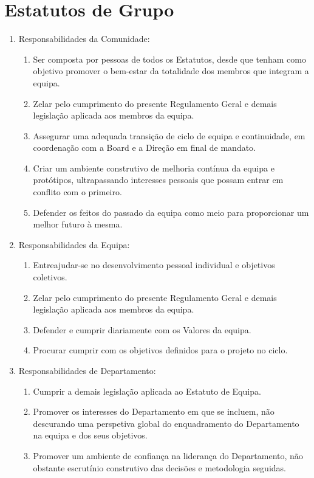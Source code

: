 \section{Estatutos de Grupo}
\begin{enumerate}
  \item Responsabilidades da Comunidade:
  \begin{enumerate}
    \item Ser composta por pessoas de todos os Estatutos, desde que tenham como objetivo promover o bem-estar da totalidade dos membros que integram a equipa.
    \item Zelar pelo cumprimento do presente Regulamento Geral e demais legislação aplicada aos membros da equipa.
    \item Assegurar uma adequada transição de ciclo de equipa e continuidade, em coordenação com a Board e a Direção em final de mandato.
    \item Criar um ambiente construtivo de melhoria contínua da equipa e protótipos, ultrapassando interesses pessoais que possam entrar em conflito com o primeiro.
    \item Defender os feitos do passado da equipa como meio para proporcionar um melhor futuro à mesma.
  \end{enumerate}
  \item Responsabilidades da Equipa:
  \begin{enumerate}
    \item Entreajudar-se no desenvolvimento pessoal individual e objetivos coletivos.
    \item Zelar pelo cumprimento do presente Regulamento Geral e demais legislação aplicada aos membros da equipa.
    \item Defender e cumprir diariamente com os Valores da equipa.
    \item Procurar cumprir com os objetivos definidos para o projeto no ciclo.
  \end{enumerate}
  \item Responsabilidades de Departamento:
  \begin{enumerate}
    \item Cumprir a demais legislação aplicada ao Estatuto de Equipa.
    \item Promover os interesses do Departamento em que se incluem, não descurando uma perspetiva global do enquadramento do Departamento na equipa e dos seus objetivos.
    \item Promover um ambiente de confiança na liderança do Departamento, não obstante escrutínio construtivo das decisões e metodologia seguidas.

\end{enumerate}
\end{enumerate}
